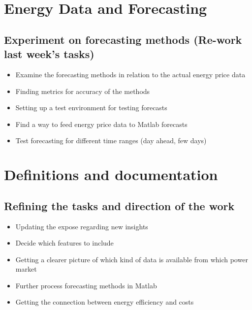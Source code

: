 \documentclass[a4paper]{article}
\begin{document}
\vspace{1em}

\hfill\date{Week 17, from 21.04. to 27.04.}

\section{Energy Data and Forecasting}

\subsection{Experiment on forecasting methods (Re-work last week's tasks)}

\begin{itemize}

\item Examine the forecasting methods in relation to the actual energy price data

\item Finding metrics for accuracy of the methods

\item Setting up a test environment for testing forecasts

\item Find a way to feed energy price data to Matlab forecasts

\item Test forecasting for different time ranges (day ahead, few days)

\end{itemize}

\pagebreak

\vspace{1em}

\hfill\date{Week 18, from 28.04. to 04.05.}

\section{Definitions and documentation}

\subsection{Refining the tasks and direction of the work}

\begin{itemize}

\item Updating the expose regarding new insights

\item Decide which features to include

\item Getting a clearer picture of which kind of data is available from which power market

\item Further process forecasting methods in Matlab

\item Getting the connection between energy efficiency and costs

\end{itemize}
\end{document}
